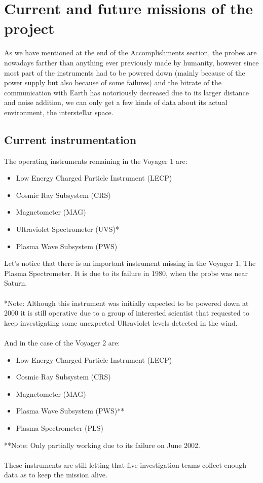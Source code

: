 \documentclass[11pt,a4paper]{article}
\begin{document}
\section{Current and future missions of the project}
As we have mentioned at the end of the Accomplishments section, the probes are nowadays farther than anything ever previously made by humanity, however since most part of the instruments had to be powered down (mainly because of the power supply but also because of some failures) and the bitrate of the communication with Earth has notoriously decreased due to its larger distance and noise addition, we can only get a few kinds of data about its actual environment, the interstellar space.

\subsection{Current instrumentation}
The operating instruments remaining in the Voyager 1 are:
\begin{itemize}
\item Low Energy Charged Particle Instrument (LECP)
\item Cosmic Ray Subsystem (CRS)
\item Magnetometer (MAG)
\item Ultraviolet Spectrometer (UVS)*
\item Plasma Wave Subsystem (PWS)
\end{itemize}
Let's notice that there is an important instrument missing in the Voyager 1, The Plasma Spectrometer. It is due to its failure in 1980, when the probe was near Saturn.
\\\\
*Note: Although this instrument was initially expected to be powered down at 2000 it is still operative due to a group of interested scientist that requested to keep investigating some unexpected Ultraviolet levels detected in the wind.
\\\\
And in the case of the Voyager 2 are: 
\begin{itemize}
\item Low Energy Charged Particle Instrument (LECP)
\item Cosmic Ray Subsystem (CRS)
\item Magnetometer (MAG)
\item Plasma Wave Subsystem (PWS)**
\item Plasma Spectrometer (PLS)
\end{itemize}
**Note: Only partially working due to its failure on June 2002.
\\\\
These instruments are still letting that five investigation teams collect enough data as to keep the mission alive.
\end{document}
